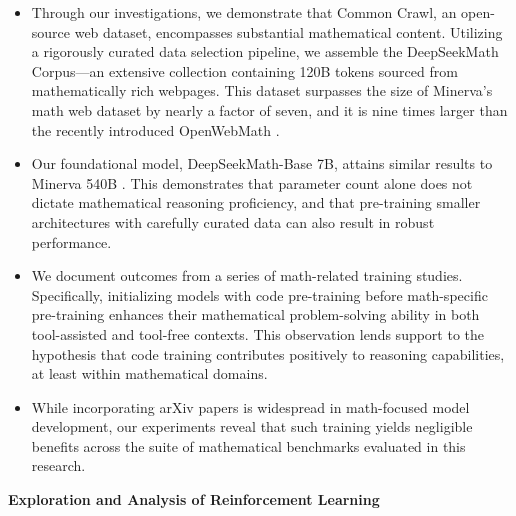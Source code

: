 \begin{itemize}[topsep=0pt]
    \item Through our investigations, we demonstrate that Common Crawl, an open-source web dataset, encompasses substantial mathematical content. Utilizing a rigorously curated data selection pipeline, we assemble the DeepSeekMath Corpus—an extensive collection containing 120B tokens sourced from mathematically rich webpages. This dataset surpasses the size of Minerva's math web dataset \citep{minerva} by nearly a factor of seven, and it is nine times larger than the recently introduced OpenWebMath \citep{openwebmath}.

    \item Our foundational model, DeepSeekMath-Base 7B, attains similar results to Minerva 540B \citep{minerva}. This demonstrates that parameter count alone does not dictate mathematical reasoning proficiency, and that pre-training smaller architectures with carefully curated data can also result in robust performance.

    \item We document outcomes from a series of math-related training studies. Specifically, initializing models with code pre-training before math-specific pre-training enhances their mathematical problem-solving ability in both tool-assisted and tool-free contexts. This observation lends support to the hypothesis that code training contributes positively to reasoning capabilities, at least within mathematical domains.

    \item While incorporating arXiv papers is widespread in math-focused model development, our experiments reveal that such training yields negligible benefits across the suite of mathematical benchmarks evaluated in this research.
\end{itemize}

\textbf{Exploration and Analysis of Reinforcement Learning}

